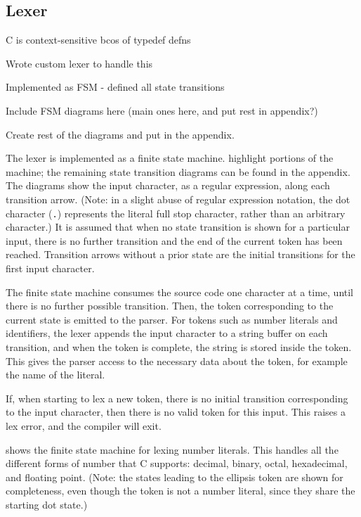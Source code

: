 \documentclass[00-main.tex]{subfiles}
\begin{document}
\subsection{Lexer}

\begin{Comment}
C is context-sensitive bcos of typedef defns

Wrote custom lexer to handle this

Implemented as FSM - defined all state transitions

Include FSM diagrams here (main ones here, and put rest in appendix?)
\end{Comment}
\begin{Comment}
Create rest of the diagrams and put in the appendix.
\end{Comment}

The lexer is implemented as a finite state machine.  highlight portions of the machine; the remaining state transition diagrams can be found in the appendix.
The diagrams show the input character, as a regular expression, along each transition arrow. (Note: in a slight abuse of regular expression notation, the dot character (\texttt{.}) represents the literal full stop character, rather than an arbitrary character.)
It is assumed that when no state transition is shown for a particular input, there is no further transition and the end of the current token has been reached.
Transition arrows without a prior state are the initial transitions for the first input character.

The finite state machine consumes the source code one character at a time, until there is no further possible transition.
Then, the token corresponding to the current state is emitted to the parser.
For tokens such as number literals and identifiers, the lexer appends the input character to a string buffer on each transition, and when the token is complete, the string is stored inside the token.
This gives the parser access to the necessary data about the token, for example the name of the literal.

If, when starting to lex a new token, there is no initial transition corresponding to the input character, then there is no valid token for this input. This raises a lex error, and the compiler will exit.

 shows the finite state machine for lexing number literals. This handles all the different forms of number that C supports: decimal, binary, octal, hexadecimal, and floating point.
(Note: the states leading to the ellipsis token are shown for completeness, even though the token is not a number literal, since they share the starting dot state.)
\end{document}
